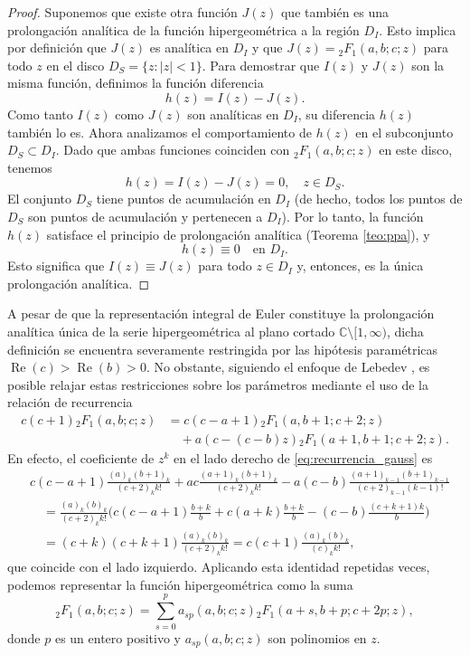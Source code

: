 \documentclass[12pt,a4paper]{book}
\renewcommand{\Re}{\operatorname{Re}}
\begin{document}
\begin{proof}
Suponemos que existe otra función $J(z)$ que también es una prolongación analítica de la función hipergeométrica a la región $D_I$.
Esto implica por definición que $J(z)$ es analítica en $D_I$ y que $J(z) = {}_{2}F_{1}(a,b;c;z)$ para todo $z$ en el disco $D_S = \{z : |z| < 1\}$.
Para demostrar que $I(z)$ y $J(z)$ son la misma función, definimos la función diferencia
\[
h(z) = I(z) - J(z). 
\]
Como tanto $I(z)$ como $J(z)$ son analíticas en $D_I$, su diferencia $h(z)$ también lo es.
Ahora analizamos el comportamiento de $h(z)$ en el subconjunto $D_S \subset D_I$. Dado que ambas funciones coinciden con ${}_{2}F_{1}(a,b;c;z)$ en este disco, tenemos
\[
h(z) = I(z) - J(z) = 0, \quad z \in D_S. 
\]
El conjunto $D_S$ tiene puntos de acumulación en $D_I$ (de hecho, todos los puntos de $D_S$ son puntos de acumulación y pertenecen a $D_I$). Por lo tanto, la función $h(z)$ satisface el principio de prolongación analítica (Teorema \ref{teo:ppa}), y
\[
h(z) \equiv 0 \quad \text{en } D_I.
\]
Esto significa que $I(z) \equiv J(z)$ para todo $z \in D_I$ y, entonces, es la única prolongación analítica. 
\end{proof}

A pesar de que la representación integral de Euler constituye la prolongación analítica única de la serie hipergeométrica al plano cortado $\mathbb{C} \setminus [1, \infty)$, dicha definición se encuentra severamente restringida por las hipótesis paramétricas $\Re(c) > \Re(b) > 0$. No obstante, siguiendo el enfoque de Lebedev \cite[cap.~9]{lebedev}, es posible relajar estas restricciones sobre los parámetros mediante el uso de la relación de recurrencia 
\begin{equation}
\label{eq:recurrencia_gauss}
\begin{split}
    c(c + 1){}_{2}F_{1}(a,b;c;z) &= c(c - a + 1){}_{2}F_{1}(a, b + 1; c + 2; z) \\ 
    &\quad + a(c - (c - b)z){}_{2}F_{1}(a + 1, b + 1; c + 2; z).
\end{split}
\end{equation}
En efecto, el coeficiente de $z^k$ en el lado derecho de \eqref{eq:recurrencia_gauss} es
\begin{align*}
    & c(c - a + 1)\frac{(a)_k(b + 1)_k}{(c + 2)_k k!} + ac\frac{(a + 1)_k(b + 1)_k}{(c + 2)_k k!} - a(c - b)\frac{(a + 1)_{k-1}(b + 1)_{k-1}}{(c + 2)_{k-1}(k - 1)!} \\
    &\quad = \frac{(a)_k(b)_k}{(c + 2)_k k!} \bigg( c(c - a + 1)\frac{b + k}{b} + c(a + k)\frac{b + k}{b} - (c - b)\frac{(c + k + 1)k}{b} \bigg) \\
    &\quad = (c + k)(c + k + 1)\frac{(a)_k(b)_k}{(c + 2)_k k!} = c(c + 1)\frac{(a)_k(b)_k}{(c)_k k!},
\end{align*}
que coincide con el lado izquierdo. Aplicando esta identidad repetidas veces, podemos representar la función hipergeométrica como la suma
\begin{equation}
\label{eq:recurrencia_gauss_p}
    {}_{2}F_{1}(a,b;c;z) = \sum_{s=0}^p a_{sp}(a,b;c;z){}_{2}F_{1}(a+s,b+p;c+2p;z),
\end{equation}
donde $p$ es un entero positivo y $a_{sp}(a,b;c;z)$ son polinomios en $z$. 
\end{document}
